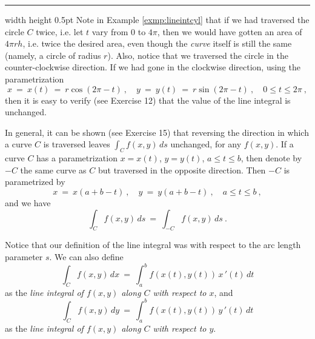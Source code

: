 \hrule width \textwidth height 0.5pt
\medskip
Note in Example \ref{exmp:lineintcyl} that if we had traversed the circle $C$ twice, i.e. let $t$ vary from $0$
to $4\pi$, then we would have gotten an area of $4\pi r h$, i.e. twice the desired area, even though the \emph{curve}
itself is still the same (namely, a circle of radius $r$). Also, notice that we traversed the circle in the
counter-clockwise direction. If we had gone in the clockwise direction, using the parametrization
\begin{equation}\label{eqn:lineintcylcwise}
 x ~=~ x(t) ~=~ r \cos (2\pi - t) ~,\quad y ~=~ y(t) ~=~ r \sin (2\pi - t)~,\quad 0 \le t \le 2\pi ~,
\end{equation}
then it is easy to verify (see Exercise 12) that the value of the line integral is unchanged.

In general, it can be shown
(see Exercise 15) that reversing the direction in which a curve $C$ is traversed leaves $\int_C f(x,y)\,ds$ unchanged,
for any $f(x,y)$. If a curve $C$ has a parametrization $x=x(t)$, $y=y(t)$, $a \le t \le b$, then denote by $-C$ the
same curve as $C$ but traversed in the opposite direction. Then $-C$ is parametrized by
\begin{equation}\label{eqn:reversec}
 x ~=~ x(a+b-t)~,\quad y ~=~ y(a+b-t)~,\quad a \le t \le b ~,
\end{equation}
and we have
\begin{equation}
 \int_C f(x,y)\,ds ~=~ \int_{-C} f(x,y)\,ds ~.
\end{equation}

Notice that our definition of the line integral was with respect to the arc length parameter $s$. We can also
define
\begin{equation}\label{eqn:lineintx2}
 \int_C f(x,y)\,dx ~=~ \int_a^b f(x(t),y(t)) \,x\,'(t)\,dt
\end{equation}
as the \emph{line integral of $f(x,y)$ along $C$ with respect to $x$}, and
\begin{equation}\label{eqn:lineinty2}
 \int_C f(x,y)\,dy ~=~ \int_a^b f(x(t),y(t)) \,y\,'(t)\,dt
\end{equation}
as the \emph{line integral of $f(x,y)$ along $C$ with respect to $y$}.

